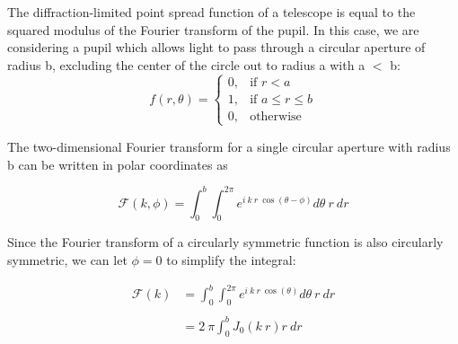\begin{answer}

The diffraction-limited point spread function of a telescope is equal
to the squared modulus of the Fourier transform of the pupil. In this
case, we are considering a pupil which allows light to pass through a
circular aperture of radius b, excluding the center of the circle out
to radius a with a $<$ b:
\begin{equation}
f(r,\theta)= 
\begin{cases}
   0,& \text{if } r < a\\
   1,& \text{if } a \leq r \leq b\\
    0,              & \text{otherwise}
\end{cases}
\end{equation}

The two-dimensional Fourier transform for a single circular aperture
with radius b can be written in polar coordinates as

\begin{equation}
\mathcal{F}(k,\phi)= \int_{0}^{b} \int_{0}^{2\pi} e^{i \: k \: r \: \cos(\theta-\phi)} d\theta \: r \: dr
\end{equation}

Since the Fourier transform of a circularly symmetric function is also circularly symmetric, we can let $\phi=0$ to simplify the integral:

\begin{align*}
\mathcal{F}(k) &= \int_{0}^{b} \int_{0}^{2\pi} e^{i \: k \: r \: \cos(\theta)} d\theta \: r \: dr \\ \\
&= 2 \: \pi \int_{0}^{b} J_0 (k \: r) r \: dr
\end{align*}


\end{answer}
